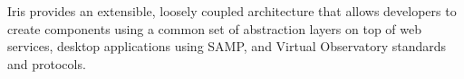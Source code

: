 Iris provides an extensible, loosely coupled architecture that allows developers to create components using a common set of abstraction layers on top of web services, desktop applications using SAMP, and Virtual Observatory standards and protocols.